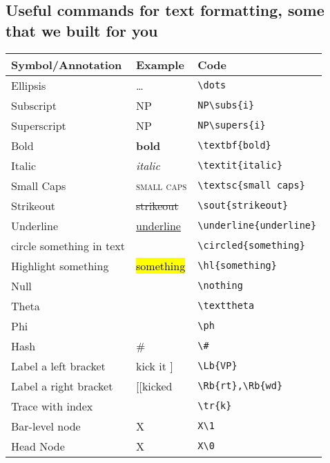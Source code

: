 \documentclass{article}
\begin{document}
\subsection{Useful commands for text formatting, some that we built for you}

\ea 
	\begin{tabular}[t]{l l l}
		\toprule
		\textbf{Symbol/Annotation} & \textbf{Example} & \textbf{Code} \\ \midrule
		Ellipsis & \dots & \verb|\dots| \\
		Subscript & NP\subs{i} & \verb|NP\subs{i}| \\
		Superscript & NP\supers{i} & \verb|NP\supers{i}|\\ 
		Bold & \textbf{bold} & \verb|\textbf{bold}| \\
		Italic & \textit{italic} & \verb|\textit{italic}| \\
		Small Caps & \textsc{small caps} & \verb|\textsc{small caps}| \\
		Strikeout & \sout{strikeout} & \verb|\sout{strikeout}| \\
		Underline & \underline{underline} & \verb|\underline{underline}| \\
		circle something in text & \circled{something} & \verb|\circled{something}| \\
		Highlight something & \hl{something} & \verb|\hl{something}| \\
		Null & \nothing  & \verb|\nothing|\\
		Theta & \texttheta & \verb|\texttheta|  \\
		Phi & \ph & \verb|\ph| \\
		Hash & \# & \verb|\#| \\
		Label a left bracket & \Lb{VP} kick it ] & \verb|\Lb{VP}|\\
		Label a right bracket & [[kick\Rb{rt}ed\Rb{wd} & \verb|\Rb{rt},\Rb{wd}|\\
		Trace with index & \tr{k}  & \verb|\tr{k}| \\
		Bar-level node & X\1 & \verb|X\1| \\
		Head Node & X\0 & \verb|X\0| \\
		\bottomrule
	\end{tabular}
\z

\newpage 
\end{document}
